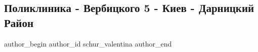  
 
 
 
 
 
\subsection{Поликлиника - Вербицкого 5 - Киев - Дарницкий Район}
\label{sec:30_06_2021.fb.schur_valentina.1.poliklinika_verbickogo_darnickij_kiev}
\ifcmt
 author_begin
   author_id schur_valentina
 author_end
\fi


